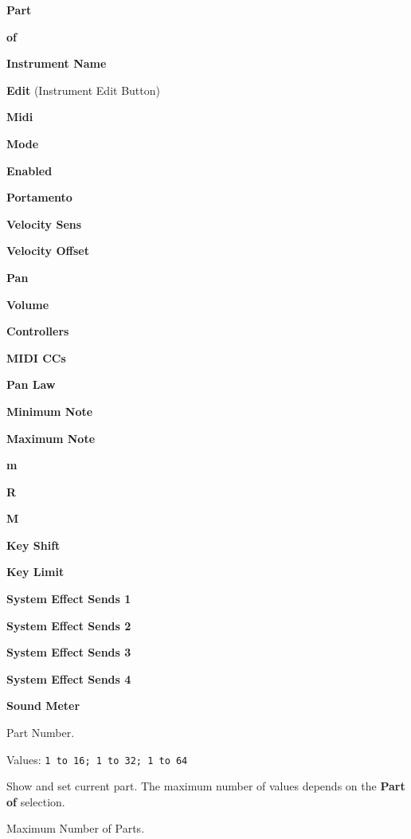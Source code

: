    \begin{enumber}
      \item \textbf{Part}
      \item \textbf{of}
      \item \textbf{Instrument Name}
      \item \textbf{Edit} (Instrument Edit Button)
      \item \textbf{Midi}
      \item \textbf{Mode}
      \item \textbf{Enabled}
      \item \textbf{Portamento}
      \item \textbf{Velocity Sens}
      \item \textbf{Velocity Offset}
      \item \textbf{Pan}
      \item \textbf{Volume}
      \item \textbf{Controllers}
      \item \textbf{MIDI CCs}
      \item \textbf{Pan Law}
      \item \textbf{Minimum Note}
      \item \textbf{Maximum Note}
      \item \textbf{m}
      \item \textbf{R}
      \item \textbf{M}
      \item \textbf{Key Shift}
      \item \textbf{Key Limit}
      \item \textbf{System Effect Sends 1}
      \item \textbf{System Effect Sends 2}
      \item \textbf{System Effect Sends 3}
      \item \textbf{System Effect Sends 4}
      \item \textbf{Sound Meter}
   \end{enumber}

   \setcounter{ItemCounter}{0}      %

   Part Number.

   Values: \texttt{1 to 16; 1 to 32; 1 to 64 }

   Show and set current part.  The maximum number of values depends on the
   \textbf{Part of} selection.

   Maximum Number of Parts.

